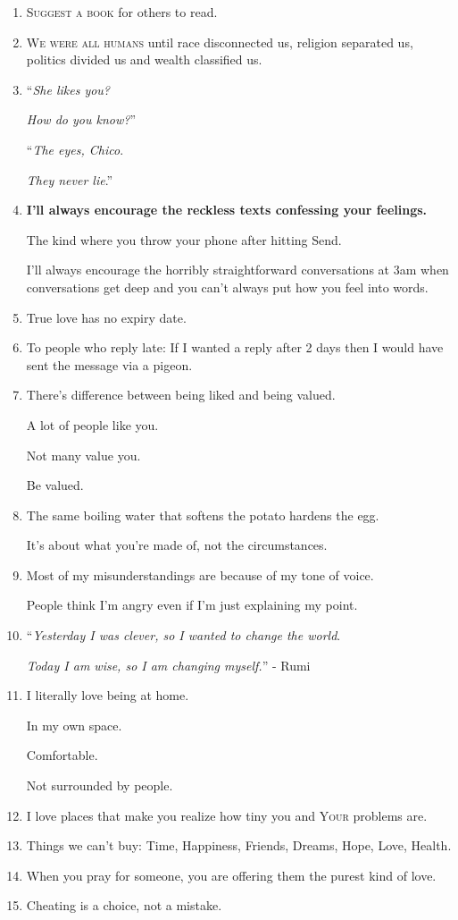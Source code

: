 \documentclass{article}
\numberwithin{equation}{section}
\begin{document}
\begin{enumerate}
    Not everything is real \& not everyone is true.
    \item \textsc{Suggest a book} for others to read.
    \item \textsc{We were all humans} until race disconnected us, religion separated us, politics divided us and wealth classified us.
    \item ``\textit{She likes you?}
    
    \textit{How do you know?}''
    
    ``\textit{The eyes, Chico}.
    
    \textit{They never lie}.''
    \item \textbf{I'll always encourage the reckless texts confessing your feelings.}
    
    The kind where you throw your phone after hitting Send.
    
    I'll always encourage the horribly straightforward conversations at 3am when conversations get deep and you can't always put how you feel into words.
    \item True love has no expiry date.
    \item To people who reply late: If I wanted a reply after 2 days then I would have sent the message via a pigeon.
    \item There's difference between being liked and being valued.
    
    A lot of people like you.
    
    Not many value you.
    
    Be valued.
    \item The same boiling water that softens the potato hardens the egg.
    
    It's about what you're made of, not the circumstances.
    \item Most of my misunderstandings are because of my tone of voice.
    
    People think I'm angry even if I'm just explaining my point.
    \item ``\textit{Yesterday I was clever, so I wanted to change the world}.
    
    \textit{Today I am wise, so I am changing myself.}'' - Rumi
    \item I literally love being at home.
    
    In my own space.
    
    Comfortable.
    
    Not surrounded by people.
    \item I love places that make you realize how tiny you and \textsc{Your} problems are.
    \item Things we can't buy: Time, Happiness, Friends, Dreams, Hope, Love, Health.
    \item When you pray for someone, you are offering them the purest kind of love.
    \item Cheating is a choice, not a mistake.
    

\end{enumerate}
\end{document}
